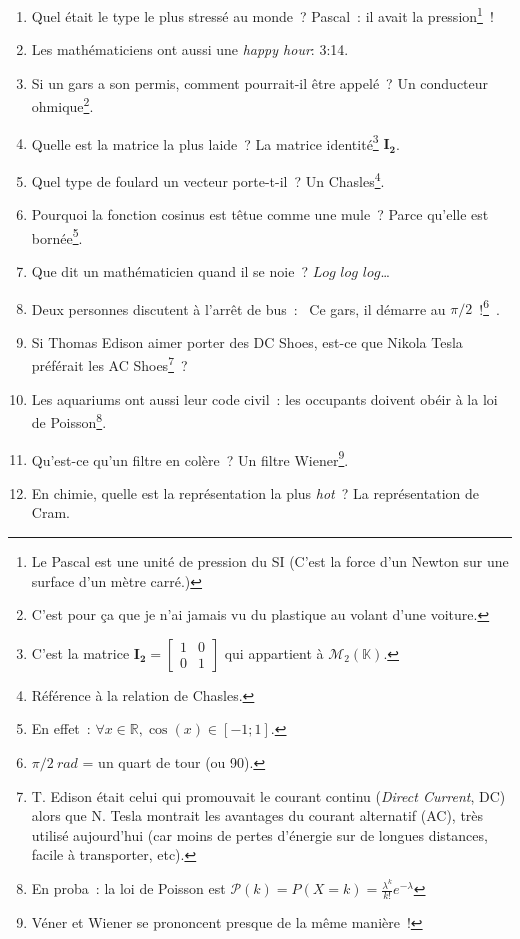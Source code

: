 \documentclass[10pt,a5paper,fullpage]{book}
\begin{document}
\begin{enumerate}
		\item Quel était le type le plus stressé au monde~? Pascal~: il avait la pression\footnote{Le Pascal est une unité de pression du SI (C'est la force d'un Newton sur une surface d'un mètre carré.)}~!
		\item Les mathématiciens ont aussi une \textit{happy hour}: 3:14. 
		\item Si un gars a son permis, comment pourrait-il être appelé~? Un conducteur ohmique\footnote{C'est pour ça que je n'ai jamais vu du plastique au volant d'une voiture.}. 
		\item Quelle est la matrice la plus laide~? La matrice identité\footnote{C’est la matrice $\mathbf{I_{2}} =  				
		\begin{bmatrix}
			1 & 0 \\0 & 1
		\end{bmatrix}$
		qui appartient à $\mathcal{M}_{2}(\mathbb{K})$.} $\mathbf{I_{2}}$.
		\item Quel type de foulard un vecteur porte-t-il~? Un Chasles\footnote{Référence à la relation de Chasles.}. 
		\item Pourquoi la fonction cosinus est têtue comme une mule~? Parce qu’elle est bornée\footnote{En effet~: $\forall x \in \mathbb{R}, \cos(x) \in [-1;1].$}.
		\item Que dit un mathématicien quand il se noie~? $Log$ $log$ $log$\ldots
		\item Deux personnes discutent à l’arrêt de bus~: \guillemotleft~Ce gars, il démarre au $\pi/2$~!\footnote{$\pi/2~rad$ = un quart de tour (ou 90\textdegree).}~\guillemotright. 
		\item Si Thomas Edison aimer porter des DC Shoes, est-ce que Nikola Tesla préférait les AC Shoes\footnote{T. Edison était celui qui promouvait le courant continu (\textit{Direct Current}, DC) alors que N. Tesla montrait les avantages du courant alternatif (AC), très utilisé aujourd'hui (car moins de pertes d'énergie sur de longues distances, facile à transporter, etc).}~?
		\item Les aquariums ont aussi leur code civil~: les occupants doivent obéir à la loi de Poisson\footnote{En proba~: la loi de Poisson est $\mathcal{P}(k) = P(X = k) = \frac{\lambda^{k}}{k!}e^{-\lambda}$}.
		\item Qu’est-ce qu’un filtre en colère~? Un filtre Wiener\footnote{Véner et Wiener se prononcent presque de la même manière~!}.
		\item En chimie, quelle est la représentation la plus \textit{hot}~? La représentation de Cram.

\end{enumerate}
\end{document}
